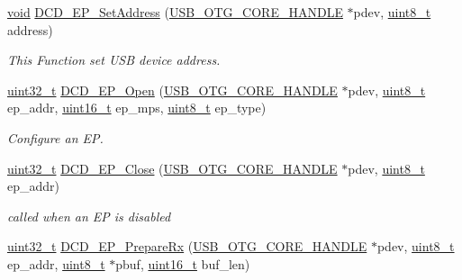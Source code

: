 \begin{DoxyCompactItemize}
\hyperlink{group___n_a_m_e_ga18028b8badbf1ea7e704ccac3c488e82}{void} \hyperlink{group___u_s_b___d_c_d___exported___functions_prototype_ga14cab44ffb4094334bb0292ea81c9a5a}{D\-C\-D\-\_\-\-E\-P\-\_\-\-Set\-Address} (\hyperlink{group___u_s_b___c_o_r_e___exported___types_gaf76054c11eb8a3367907aad7ae700e80}{U\-S\-B\-\_\-\-O\-T\-G\-\_\-\-C\-O\-R\-E\-\_\-\-H\-A\-N\-D\-L\-E} $\ast$pdev, \hyperlink{stdint_8h_aba7bc1797add20fe3efdf37ced1182c5}{uint8\-\_\-t} address)
\begin{DoxyCompactList}\small\item\em This Function set U\-S\-B device address. \end{DoxyCompactList}\item 
\hyperlink{stdint_8h_a435d1572bf3f880d55459d9805097f62}{uint32\-\_\-t} \hyperlink{group___u_s_b___d_c_d___exported___functions_prototype_ga9d1aa06cfde8fe3442ab7486c6c5bbdd}{D\-C\-D\-\_\-\-E\-P\-\_\-\-Open} (\hyperlink{group___u_s_b___c_o_r_e___exported___types_gaf76054c11eb8a3367907aad7ae700e80}{U\-S\-B\-\_\-\-O\-T\-G\-\_\-\-C\-O\-R\-E\-\_\-\-H\-A\-N\-D\-L\-E} $\ast$pdev, \hyperlink{stdint_8h_aba7bc1797add20fe3efdf37ced1182c5}{uint8\-\_\-t} ep\-\_\-addr, \hyperlink{stdint_8h_a273cf69d639a59973b6019625df33e30}{uint16\-\_\-t} ep\-\_\-mps, \hyperlink{stdint_8h_aba7bc1797add20fe3efdf37ced1182c5}{uint8\-\_\-t} ep\-\_\-type)
\begin{DoxyCompactList}\small\item\em Configure an E\-P. \end{DoxyCompactList}\item 
\hyperlink{stdint_8h_a435d1572bf3f880d55459d9805097f62}{uint32\-\_\-t} \hyperlink{group___u_s_b___d_c_d___exported___functions_prototype_ga6fdf047e0b91049b43d9cb2b1c39dcb8}{D\-C\-D\-\_\-\-E\-P\-\_\-\-Close} (\hyperlink{group___u_s_b___c_o_r_e___exported___types_gaf76054c11eb8a3367907aad7ae700e80}{U\-S\-B\-\_\-\-O\-T\-G\-\_\-\-C\-O\-R\-E\-\_\-\-H\-A\-N\-D\-L\-E} $\ast$pdev, \hyperlink{stdint_8h_aba7bc1797add20fe3efdf37ced1182c5}{uint8\-\_\-t} ep\-\_\-addr)
\begin{DoxyCompactList}\small\item\em called when an E\-P is disabled \end{DoxyCompactList}\item 
\hyperlink{stdint_8h_a435d1572bf3f880d55459d9805097f62}{uint32\-\_\-t} \hyperlink{group___u_s_b___d_c_d___exported___functions_prototype_gadb1ab76f48d6ea405e62c68af8ea6444}{D\-C\-D\-\_\-\-E\-P\-\_\-\-Prepare\-Rx} (\hyperlink{group___u_s_b___c_o_r_e___exported___types_gaf76054c11eb8a3367907aad7ae700e80}{U\-S\-B\-\_\-\-O\-T\-G\-\_\-\-C\-O\-R\-E\-\_\-\-H\-A\-N\-D\-L\-E} $\ast$pdev, \hyperlink{stdint_8h_aba7bc1797add20fe3efdf37ced1182c5}{uint8\-\_\-t} ep\-\_\-addr, \hyperlink{stdint_8h_aba7bc1797add20fe3efdf37ced1182c5}{uint8\-\_\-t} $\ast$pbuf, \hyperlink{stdint_8h_a273cf69d639a59973b6019625df33e30}{uint16\-\_\-t} buf\-\_\-len)

\end{DoxyCompactItemize}
